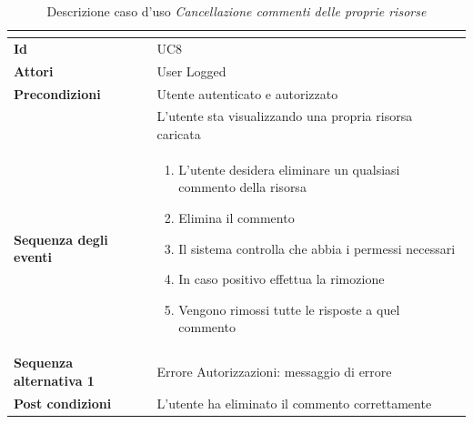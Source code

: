 \documentclass[a4paper]{article}
\begin{document}
\begin{table}[H]
    \centering
    \renewcommand{\arraystretch}{1.5}
    \begin{tabular}{|>{\bfseries}l|p{10cm}|}
        \hline
        \multicolumn{2}{|c|}{\textbf{Caso d'uso: Cancellazione commenti delle proprie risorse}} \\
        \hline
        \textbf{Id} & UC8 \\ \hline
        \textbf{Attori} & User Logged \\ \hline
        \textbf{Precondizioni} & Utente autenticato e autorizzato \\
        & L'utente sta visualizzando una propria risorsa caricata \\ \hline
        \textbf{Sequenza degli eventi} &
        \begin{enumerate}
            \item L'utente desidera eliminare un qualsiasi commento della risorsa
            \item Elimina il commento
            \item Il sistema controlla che abbia i permessi necessari
            \item In caso positivo effettua la rimozione
            \item Vengono rimossi tutte le risposte a quel commento
        \end{enumerate}\\ \hline
        \textbf{Sequenza alternativa 1} & Errore Autorizzazioni: messaggio di errore \\ \hline
        \textbf{Post condizioni} & L'utente ha eliminato il commento correttamente \\ \hline
    \end{tabular}
    \caption{Descrizione caso d'uso \textit{Cancellazione commenti delle proprie risorse}}
    \label{tab:delete_comments_own_resources-usecase}
\end{table}
\end{document}
